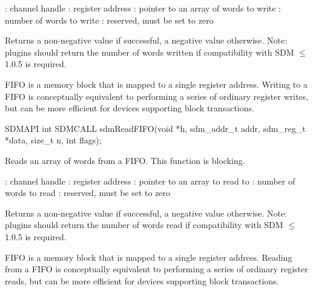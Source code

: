 \documentclass[a4paper,12pt,twoside,extrafontsizes]{memoir}
\begin{document}
\begin{funcparams}
	: channel handle
	: register address
	: pointer to an array of words to write
	: number of words to write
	: reserved, must be set to zero
\end{funcparams}

\begin{funcret}
	Returns a non-negative value if successful, a negative value otherwise. Note: plugins should return the number of words written if compatibility with SDM $\le$ 1.0.5 is required.
\end{funcret}

\begin{funcremarks}
	FIFO is a memory block that is mapped to a single register address. Writing to a FIFO is conceptually equivalent to performing a series of ordinary register writes, but can be more efficient for devices supporting block transactions.
\end{funcremarks}



\begin{cfuncprototype}
SDMAPI int SDMCALL sdmReadFIFO(void *h, sdm_addr_t addr, sdm_reg_t *data, size_t n, int flags);
\end{cfuncprototype}

\begin{funcdescr}
	Reads an array of words from a FIFO. This function is blocking.
\end{funcdescr}

\begin{funcparams}
	: channel handle
	: register address
	: pointer to an array to read to
	: number of words to read
	: reserved, must be set to zero
\end{funcparams}

\begin{funcret}
	Returns a non-negative value if successful, a negative value otherwise. Note: plugins should return the number of words read if compatibility with SDM $\le$ 1.0.5 is required.
\end{funcret}

\begin{funcremarks}
	FIFO is a memory block that is mapped to a single register address. Reading from a FIFO is conceptually equivalent to performing a series of ordinary register reads, but can be more efficient for devices supporting block transactions.
\end{funcremarks}
\end{document}
